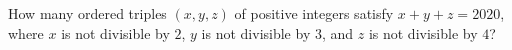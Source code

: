 How many ordered triples $(x,y,z)$ of positive integers satisfy $x+y+z=2020$, where $x$ is not divisible by $2$, $y$ is not divisible by $3$, and $z$ is not divisible by $4$?
